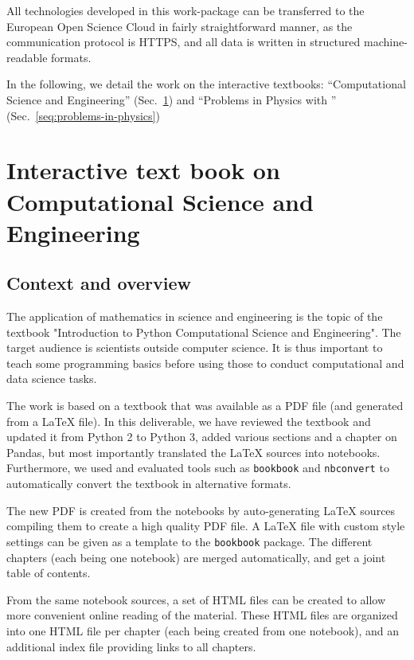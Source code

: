 \documentclass{deliverablereport}
\begin{document}
All technologies developed in this work-package can be transferred to
the European Open Science Cloud in fairly straightforward manner, as
the communication protocol is HTTPS, and all data is written in
structured machine-readable formats.


In the following, we detail the work on the interactive textbooks:
``Computational Science and Engineering'' (Sec.~\ref{sec:computational-science-and-engineering})
and ``Problems in Physics with \Sage'' (Sec.~\ref{seq:problems-in-physics})




\section{Interactive text book on Computational Science and Engineering}
\label{sec:computational-science-and-engineering}

\subsection{Context and overview}


The application of mathematics in science and engineering is the topic
of the textbook "Introduction to Python Computational Science and
Engineering".
%
The target audience is scientists outside computer science. It is
thus important to teach some programming basics before using those to
conduct computational and data science tasks.

The work is based on a textbook that was available as a PDF file (and
generated from a \LaTeX{} file). In this deliverable, we have reviewed
the textbook and updated it from Python 2 to Python 3, added various
sections and a chapter on Pandas, but most importantly translated the
\LaTeX{} sources into \Jupyter notebooks. Furthermore, we used and
evaluated tools such as \texttt{bookbook} and \texttt{nbconvert} to
automatically convert the textbook in alternative formats.

The new PDF is created from the \Jupyter notebooks by auto-generating
\LaTeX{} sources compiling them to create a high quality PDF file. A
\LaTeX{} file with custom style settings can be given as a template to
the \texttt{bookbook} package. The different chapters (each being one
notebook) are merged automatically, and get a joint table of contents.

From the same \Jupyter notebook sources, a set of HTML files can be
created to allow more convenient online reading of the material. These
HTML files are organized into one HTML file per chapter (each being
created from one notebook), and an additional index file providing
links to all chapters.
\end{document}
